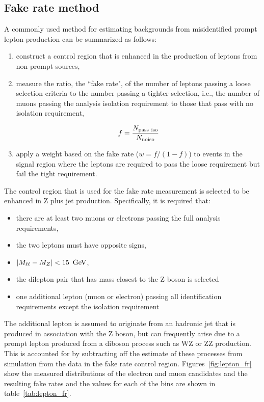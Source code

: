 \subsection{Fake rate method}

A commonly used method for estimating backgrounds from misidentified prompt lepton production can be summarized as follows:

\begin{enumerate}
    \item construct a control region that is enhanced in the production of leptons from non-prompt sources,
    
    \item measure the ratio, the ``fake rate", of the number of leptons passing a loose selection criteria to the number passing a tighter selection, i.e., the number of muons passing the analysis isolation requirement to those that pass with no isolation requirement,
    
        \begin{equation}
            f = \frac{N_{\rm pass\ iso}}{N_{\rm no iso}}
        \end{equation}

    \item apply a weight based on the fake rate ($w = f/(1-f)$) to events in the signal region where the leptons are required to pass the loose requirement but fail the tight requirement.
\end{enumerate}

The control region that is used for the fake rate measurement is selected to be enhanced in Z plus jet production.  Specifically, it is required that:

\begin{itemize}
    \item there are at least two muons or electrons passing the full analysis requirements,
    \item the two leptons must have opposite signs,
    \item $|M_{\ell\ell} - M_{Z}| < 15~\,\text{Ge\hspace{-.08em}V}$,
    \item the dilepton pair that has mass closest to the Z boson is selected
    \item one additional lepton (muon or electron) passing all
    identification requirements except the isolation requirement
\end{itemize}

The additional lepton is assumed to originate from an hadronic jet that is produced in association with the Z boson, but can frequently arise due to a prompt lepton produced from a diboson process such as WZ or ZZ production.  This is accounted for by subtracting off the estimate of these processes from simulation from the data in the fake rate control region.  Figures~\ref{fig:lepton_fr} show the measured \pt distributions of the electron and muon candidates and the resulting fake rates and the values for each of the \pt bins are shown in table~\ref{tab:lepton_fr}.


